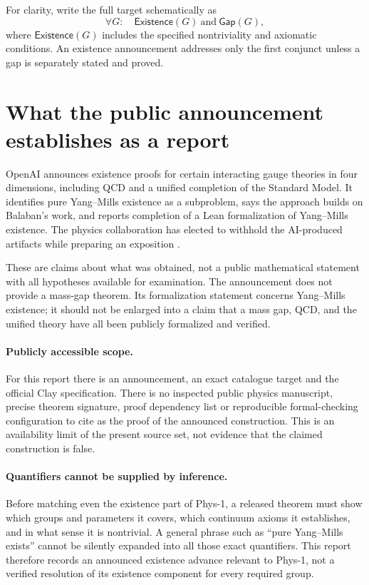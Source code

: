 \documentclass[11pt,a4paper]{article}
\numberwithin{equation}{section}
\theoremstyle{definition}
\theoremstyle{remark}
\begin{document}
For clarity, write the full target schematically as
\[
 \forall G:\quad \mathsf{Existence}(G)
       \ \text{and}\ \mathsf{Gap}(G),
\]
where $\mathsf{Existence}(G)$ includes the specified nontriviality and axiomatic
conditions. An existence announcement addresses only the first conjunct unless
a gap is separately stated and proved.

\section{What the public announcement establishes as a report}
OpenAI announces existence proofs for certain interacting gauge theories in four
dimensions, including QCD and a unified completion of the Standard Model. It
identifies pure Yang--Mills existence as a subproblem, says the approach builds
on Balaban's work, and reports completion of a Lean formalization of
Yang--Mills existence. The physics collaboration has elected to withhold the
AI-produced artifacts while preparing an exposition \cite{announcement}.

These are claims about what was obtained, not a public mathematical statement
with all hypotheses available for examination. The announcement does not provide
a mass-gap theorem. Its formalization statement concerns Yang--Mills existence;
it should not be enlarged into a claim that a mass gap, QCD, and the unified
theory have all been publicly formalized and verified.

\paragraph{Publicly accessible scope.}
For this report there is an announcement, an exact catalogue target and the
official Clay specification. There is no inspected public physics manuscript,
precise theorem signature, proof dependency list or reproducible formal-checking
configuration to cite as the proof of the announced construction. This is an
availability limit of the present source set, not evidence that the claimed
construction is false.

\paragraph{Quantifiers cannot be supplied by inference.}
Before matching even the existence part of Phys-1, a released theorem must show
which groups and parameters it covers, which continuum axioms it establishes,
and in what sense it is nontrivial. A general phrase such as ``pure Yang--Mills
exists'' cannot be silently expanded into all those exact quantifiers. This
report therefore records an announced existence advance relevant to Phys-1,
not a verified resolution of its existence component for every required group.
\end{document}
